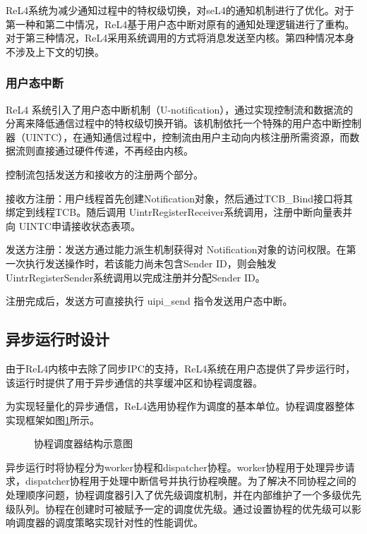 ReL4系统为减少通知过程中的特权级切换，对seL4的通知机制进行了优化。对于第一种和第二中情况，ReL4基于用户态中断对原有的通知处理逻辑进行了重构。对于第三种情况，ReL4采用系统调用的方式将消息发送至内核。第四种情况本身不涉及上下文的切换。

\subsubsection{用户态中断}

ReL4 系统引入了用户态中断机制（U-notification），通过实现控制流和数据流的分离来降低通信过程中的特权级切换开销。该机制依托一个特殊的用户态中断控制器（UINTC），在通知通信过程中，控制流由用户主动向内核注册所需资源，而数据流则直接通过硬件传递，不再经由内核。

控制流包括发送方和接收方的注册两个部分。

接收方注册：用户线程首先创建Notification对象，然后通过TCB\_Bind接口将其绑定到线程TCB。随后调用 UintrRegisterReceiver系统调用，注册中断向量表并向 UINTC申请接收状态表项。

发送方注册：发送方通过能力派生机制获得对 Notification对象的访问权限。在第一次执行发送操作时，若该能力尚未包含Sender ID，则会触发UintrRegisterSender系统调用以完成注册并分配Sender ID。

注册完成后，发送方可直接执行 uipi\_send 指令发送用户态中断。

\subsection{异步运行时设计}

由于ReL4内核中去除了同步IPC的支持，ReL4系统在用户态提供了异步运行时，该运行时提供了用于异步通信的共享缓冲区和协程调度器。

为实现轻量化的异步通信，ReL4选用协程作为调度的基本单位。协程调度器整体实现框架如图\ref{Executor}所示\cite{rel4_kernel}。

\begin{figure}[htbp]
    \centering
    
    \caption{协程调度器结构示意图}\label{Executor}
\end{figure}


异步运行时将协程分为worker协程和dispatcher协程。worker协程用于处理异步请求，dispatcher协程用于处理中断信号并执行协程唤醒。为了解决不同协程之间的处理顺序问题，协程调度器引入了优先级调度机制，并在内部维护了一个多级优先级队列。协程在创建时可被赋予一定的调度优先级。通过设置协程的优先级可以影响调度器的调度策略实现针对性的性能调优。

